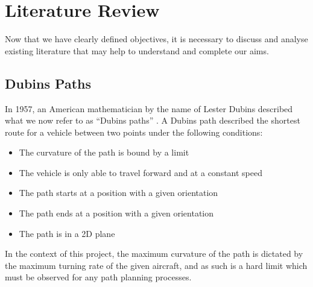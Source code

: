 
\chapter{Literature Review}
\label{litrev}

\graphicspath{{Chapter2/Figs/}}

Now that we have clearly defined objectives, it is necessary to discuss and analyse existing literature that may help to understand and complete our aims.  


\section{Dubins Paths}
\label{litrev:dubins}
In 1957, an American mathematician by the name of Lester Dubins described what we now refer to as ``Dubins paths'' \cite{dubins1957curves}. A Dubins path described the shortest route for a vehicle between two points under the following conditions:
\begin{itemize}
	\item The curvature of the path is bound by a limit
	\item The vehicle is only able to travel forward and at a constant speed
	\item The path starts at a position with a given orientation
	\item The path ends at a position with a given orientation
	\item The path is in a 2D plane
\end{itemize}

In the context of this project, the maximum curvature of the path is dictated by the maximum turning rate of the given aircraft, and as such is a hard limit which must be observed for any path planning processes.

